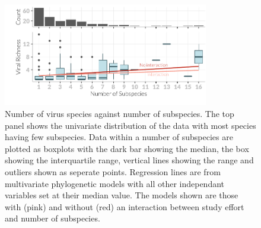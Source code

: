 \begin{knitrout}\footnotesize
{}\color{fgcolor}\begin{figure}[t]

{\centering \includegraphics[width=0.8\textwidth]{figure/boxplot-1} 

}

\caption[Number of virus species against number of subspecies]{Number of virus species against number of subspecies. 		
The top panel shows the univariate distribution of the data with most species having few subspecies.		
Data within a number of subspecies are plotted as boxplots with the dark bar showing the median, the box showing the interquartile range, vertical lines showing the range and outliers shown as seperate points.		
Regression lines are from multivariate phylogenetic models with all other independant variables set at their median value.		
The models shown are those with (pink) and without (red) an interaction between study effort and number of subspecies.		
}\label{fig:boxplot}
\end{figure}


\end{knitrout}



